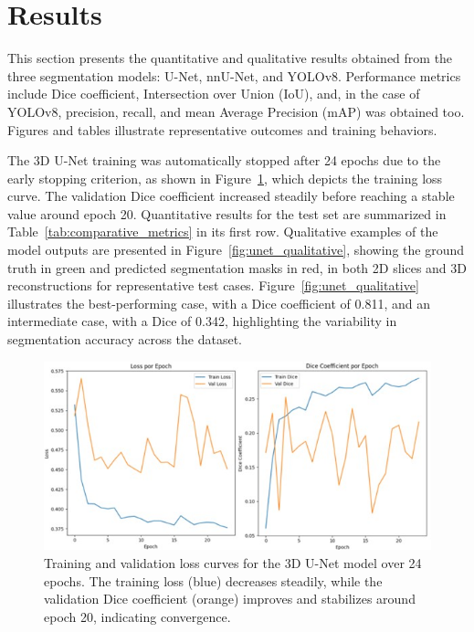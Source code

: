 \documentclass[12pt]{article}
\begin{document}



\section{Results}\label{sec:results}

This section presents the quantitative and qualitative results obtained from the three segmentation models: U-Net, nnU-Net, and YOLOv8. Performance metrics include Dice coefficient, Intersection over Union (IoU), and, in the case of YOLOv8, precision, recall, and mean Average Precision (mAP) was obtained too. Figures and tables illustrate representative outcomes and training behaviors.


The 3D U-Net training was automatically stopped after 24 epochs due to the early stopping criterion, as shown in Figure~\ref{fig:unet_loss_curve}, which depicts the training loss curve. The validation Dice coefficient increased steadily before reaching a stable value around epoch 20. Quantitative results for the test set are summarized in Table~\ref{tab:comparative_metrics} in its first row.
%
Qualitative examples of the model outputs are presented in Figure~\ref{fig:unet_qualitative}, showing the ground truth in green and predicted segmentation masks in red, in both 2D slices and 3D reconstructions for representative test cases. Figure~\ref{fig:unet_qualitative} illustrates the best-performing case, with a Dice coefficient of 0.811, and an intermediate case, with a Dice of 0.342, highlighting the variability in segmentation accuracy across the dataset.

\begin{figure}[tp]
    \centering
    \includegraphics[width=\textwidth]{figures/Figure 1.jpg}
    \caption{Training and validation loss curves for the 3D U-Net model over 24 epochs. The training loss (blue) decreases steadily, while the validation Dice coefficient (orange) improves and stabilizes around epoch 20, indicating convergence.}\label{fig:unet_loss_curve}
\end{figure}
\end{document}
